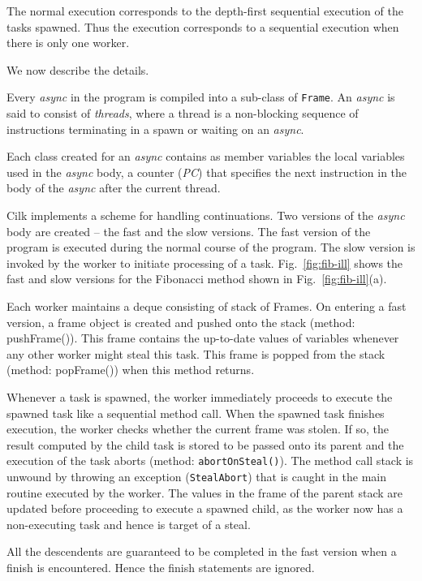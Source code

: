 The normal execution corresponds to the depth-first sequential
execution of the tasks spawned. Thus the execution corresponds to a
sequential execution when there is only one worker.

We now describe the details.

Every \emph{async} in the \Xten{} program is compiled into a sub-class
of {\tt Frame}. An \emph{async} is said to consist of {\em threads},
where a thread is a non-blocking sequence of instructions terminating
in a spawn or waiting on an \emph{async}.

Each class created for an \emph{async} contains as member variables the local
variables used in the \emph{async} body, a counter ({\em PC}) that specifies
the next instruction in the body of the \emph{async} after the current
thread.

% 
Cilk implements a scheme for handling continuations.  Two versions of
the \emph{async} body are created -- the fast and the slow
versions. The fast version of the program is executed during the
normal course of the program. The slow version is invoked by the
worker to initiate processing of a task. Fig.~\ref{fig:fib-ill} shows
the fast and slow versions for the Fibonacci method shown in
Fig.~\ref{fig:fib-ill}(a).

Each worker maintains a deque consisting of stack of Frames. On
entering a fast version, a frame object is created and pushed onto the
stack (method: {\java pushFrame()}). This frame contains the
up-to-date values of variables whenever any other worker might steal
this task. This frame is popped from the stack (method: {\java popFrame()}) 
when this method returns.

Whenever a task is spawned, the worker immediately proceeds to execute
the spawned task like a sequential method call. When the spawned task
finishes execution, the worker checks whether the current frame was
stolen. If so, the result computed by the child task is stored to be
passed onto its parent and the execution of the task aborts (method:
{\tt abortOnSteal()}). The method call stack is unwound by throwing
an exception ({\tt StealAbort}) that is caught in the main
routine executed by the worker. The values in the frame of the parent
stack are updated before proceeding to execute a spawned child, as the
worker now has a non-executing task and hence is target of a steal. 

All the descendents are guaranteed to be completed in the fast version
when a {\java finish} is encountered. Hence the finish statements
are ignored.

